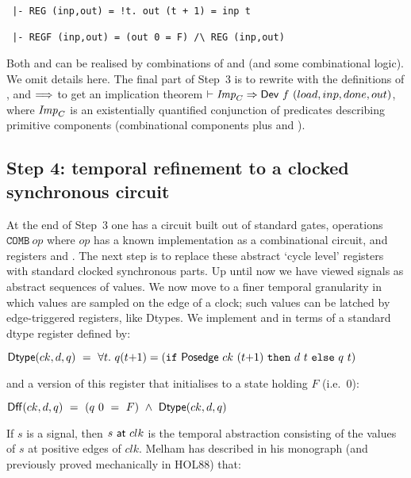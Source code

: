 \begin{verbatim}
 |- REG (inp,out) = !t. out (t + 1) = inp t 

 |- REGF (inp,out) = (out 0 = F) /\ REG (inp,out)
\end{verbatim}

Both  and  can be realised by combinations of
 and  (and some combinational logic). We omit
details here. The final part of Step~3 is to rewrite with the
definitions of ,  and $\Longrightarrow$ to get an implication
theorem $\vdash {\it{Imp}}_C \Rightarrow \mathsf{Dev}~f~(load,inp,done,out)$, where ${\it{Imp}}_C$
is an existentially quantified conjunction of predicates describing
primitive components (combinational components plus  and
).

\subsection*{Step 4: temporal refinement to a clocked synchronous circuit}

At the end of Step~3 one has a circuit built out of standard gates,
operations $\texttt{COMB}~op$ where $op$ has a known implementation as
a combinational circuit, and registers  and .  The
next step is to replace these abstract `cycle level' registers with
standard clocked synchronous parts. Up until now we have viewed
signals as abstract sequences of values.  We now move to a finer
temporal granularity in which values are sampled on the edge of a
clock; such values can be latched by edge-triggered registers, like
Dtypes. We implement  and  in terms of a standard
dtype register defined by:

\vspace*{2mm}

$\mathsf{Dtype}(ck,d,q) ~=~ \forall t.~q(t{+}1) = (\texttt{if}~\mathsf{Posedge}~ck~(t{+}1)~\texttt{then}~d~t~\texttt{else}~q~t)$

\vspace*{2mm}

\noindent and a version of this register that initialises to a state holding $F$ (i.e.~$0$):

\vspace*{2mm}

$\mathsf{Dff}(ck,d,q) ~ = ~ (q~0~ =~F)~\wedge~\mathsf{Dtype}(ck,d,q)$

\vspace*{2mm}

If $s$ is a signal, then $s~\mathsf{at}~clk$ is the temporal
abstraction consisting of the values of $s$ at positive edges of
$clk$. 
Melham has described in his monograph (and previously proved mechanically in HOL88) that:




